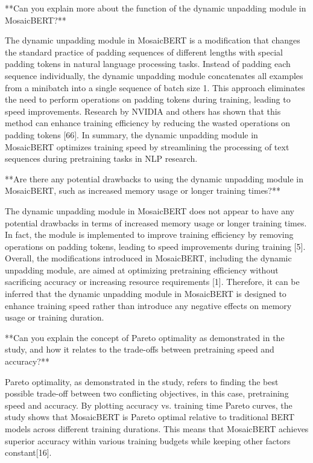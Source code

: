 \documentclass{article}
\begin{document}
**Can you explain more about the function of the dynamic unpadding module in MosaicBERT?**

The dynamic unpadding module in MosaicBERT is a modification that changes the standard practice of padding sequences of different lengths with special padding tokens in natural language processing tasks. Instead of padding each sequence individually, the dynamic unpadding module concatenates all examples from a minibatch into a single sequence of batch size 1. This approach eliminates the need to perform operations on padding tokens during training, leading to speed improvements. Research by NVIDIA and others has shown that this method can enhance training efficiency by reducing the wasted operations on padding tokens [66]. In summary, the dynamic unpadding module in MosaicBERT optimizes training speed by streamlining the processing of text sequences during pretraining tasks in NLP research.

**Are there any potential drawbacks to using the dynamic unpadding module in MosaicBERT, such as increased memory usage or longer training times?**

The dynamic unpadding module in MosaicBERT does not appear to have any potential drawbacks in terms of increased memory usage or longer training times. In fact, the module is implemented to improve training efficiency by removing operations on padding tokens, leading to speed improvements during training [5]. Overall, the modifications introduced in MosaicBERT, including the dynamic unpadding module, are aimed at optimizing pretraining efficiency without sacrificing accuracy or increasing resource requirements [1]. Therefore, it can be inferred that the dynamic unpadding module in MosaicBERT is designed to enhance training speed rather than introduce any negative effects on memory usage or training duration.

**Can you explain the concept of Pareto optimality as demonstrated in the study, and how it relates to the trade-offs between pretraining speed and accuracy?**

Pareto optimality, as demonstrated in the study, refers to finding the best possible trade-off between two conflicting objectives, in this case, pretraining speed and accuracy. By plotting accuracy vs. training time Pareto curves, the study shows that MosaicBERT is Pareto optimal relative to traditional BERT models across different training durations. This means that MosaicBERT achieves superior accuracy within various training budgets while keeping other factors constant[16].
\end{document}
